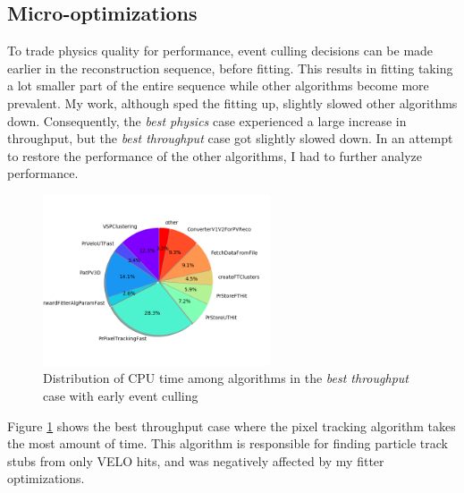 \documentclass[12pt]{article}
\begin{document}
\subsection{Micro-optimizations}

To trade physics quality for performance, event culling decisions can be made earlier in the reconstruction sequence, before fitting. This results in fitting taking a lot smaller part of the entire sequence while other algorithms become more prevalent. My work, although sped the fitting up, slightly slowed other algorithms down. Consequently, the \textit{best physics} case experienced a large increase in throughput, but the \textit{best throughput} case got slightly slowed down. In an attempt to restore the performance of the other algorithms, I had to further analyze performance.

\begin{figure}[H]
	\begin{center}
		\includegraphics[width=0.6\textwidth]{algo_usage_original_bestthru}
	\end{center}
	\caption{Distribution of CPU time among algorithms in the \textit{best throughput} case with early event culling}
	\label{fig_algo_usage_original_bestthru}
\end{figure}

Figure \ref{fig_algo_usage_original_bestthru} shows the best throughput case where the pixel tracking algorithm takes the most amount of time. This algorithm is responsible for finding particle track stubs from only VELO hits, and was negatively affected by my fitter optimizations.
\end{document}
